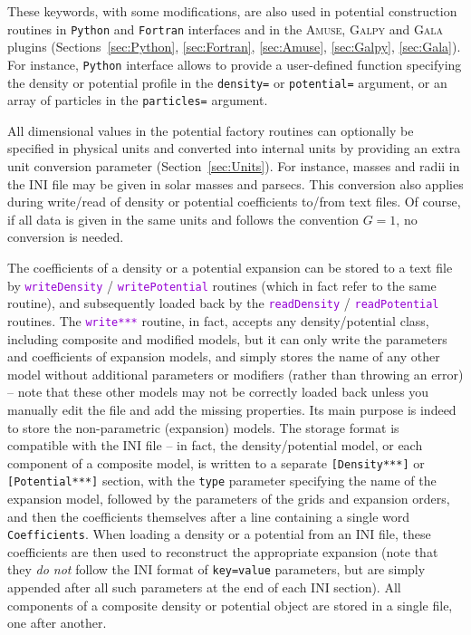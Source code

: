 \documentclass[12pt]{article}
\newcommand{\Amuse}{\textsc{Amuse}\xspace}
\newcommand{\Galpy}{\textsc{Galpy}\xspace}
\newcommand{\Gala} {\textsc{Gala}\xspace}
\newcommand{\Python}{\texttt{Python}\xspace}
\newcommand{\Fortran}{\texttt{Fortran}\xspace}
\newcommand{\ttt}[1]{\textcolor{darkviolet}{\texttt{#1}}}
\newcommand{\ppp}[1]{\textcolor{darkolive} {\texttt{#1}}}
\begin{document}
These keywords, with some modifications, are also used in potential construction routines in \Python and \Fortran interfaces and in the \Amuse, \Galpy and \Gala plugins (Sections~\ref{sec:Python}, \ref{sec:Fortran}, \ref{sec:Amuse}, \ref{sec:Galpy}, \ref{sec:Gala}). For instance, \Python interface allows to provide a user-defined function specifying the density or potential profile in the \ppp{density=} or \ppp{potential=} argument, or an array of particles in the \ppp{particles=} argument.

All dimensional values in the potential factory routines can optionally be specified in physical units and converted into internal units by providing an extra unit conversion parameter (Section~\ref{sec:Units}). For instance, masses and radii in the INI file may be given in solar masses and parsecs. This conversion also applies during write/read of density or potential coefficients to/from text files. Of course, if all data is given in the same units and follows the convention $G=1$, no conversion is needed.

The coefficients of a density or a potential expansion can be stored to a text file by \ttt{writeDensity} / \ttt{writePotential} routines (which in fact refer to the same routine), and subsequently loaded back by the \ttt{readDensity} / \ttt{readPotential} routines. 
The \ttt{write***} routine, in fact, accepts any density/potential class, including composite and modified models, but it can only write the parameters and coefficients of expansion models, and simply stores the name of any other model without additional parameters or modifiers (rather than throwing an error) -- note that these other models may not be correctly loaded back unless you manually edit the file and add the missing properties. Its main purpose is indeed to store the non-parametric (expansion) models. The storage format is compatible with the INI file -- in fact, the density/potential model, or each component of a composite model, is written to a separate \ppp{[Density***]} or \ppp{[Potential***]} section, with the \ppp{type} parameter specifying the name of the expansion model, followed by the parameters of the grids and expansion orders, and then the coefficients themselves after a line containing a single word \texttt{Coefficients}. When loading a density or a potential from an INI file, these coefficients are then used to reconstruct the appropriate expansion (note that they \emph{do not} follow the INI format of \texttt{key=value} parameters, but are simply appended after all such parameters at the end of each INI section). All components of a composite density or potential object are stored in a single file, one after another.
\end{document}
